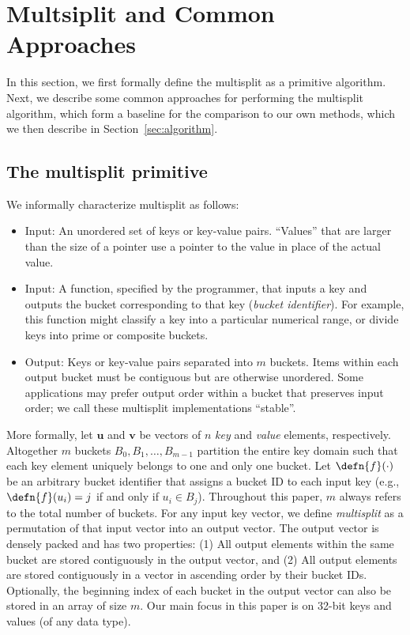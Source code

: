 \section{Multsiplit and Common Approaches}\label{sec:init_approaches}
In this section, we first formally define the multisplit as a primitive algorithm.
Next, we describe some common approaches for performing the multisplit algorithm, which form a baseline for the comparison to our own methods, which we then describe in Section~\ref{sec:algorithm}.

\subsection{The multisplit primitive}\label{sec:multisplit}

We informally characterize multisplit as follows:

\begin{itemize}
\item Input: An unordered set of keys or key-value pairs. ``Values'' that are larger than the size of a pointer use a pointer to the value in place of the actual value.
\item Input: A function, specified by the programmer, that inputs a key and outputs the bucket corresponding to that key (\emph{bucket identifier}).
For example, this function might classify a key into a particular numerical range, or divide keys into prime or composite buckets.
\item Output: Keys or key-value pairs separated into $m$ buckets. Items within each output bucket must be contiguous but are otherwise unordered. Some applications may prefer output order within a bucket that preserves input order; we call these multisplit implementations ``stable''.
\end{itemize}

\noindent
More formally, let $\mathbf{u}$ and $\mathbf{v}$ be vectors of $n$ \emph{key} and \emph{value} elements, respectively.
Altogether $m$ buckets $B_0, B_1, \dots, B_{m-1}$  partition the entire key domain such that each key element uniquely belongs to one and only one bucket.
Let $\defn{f}(\cdot)$ be an arbitrary bucket identifier that assigns a bucket ID to each input key (e.g., $\defn{f}(u_i) = j$ if and only if $u_i \in B_j$).
Throughout this paper, $m$ always refers to the total number of buckets.
For any input key vector, we define \emph{multisplit} as a permutation of that input vector into an output vector. The output vector is densely packed and has two properties: (1) All output elements within the same bucket are stored contiguously in the output vector, and (2) All output elements are stored contiguously in a vector in ascending order by their bucket IDs\@. Optionally, the beginning index of each bucket in the output vector can also be stored in an array of size $m$.
Our main focus in this paper is on 32-bit keys and values (of any data type).

